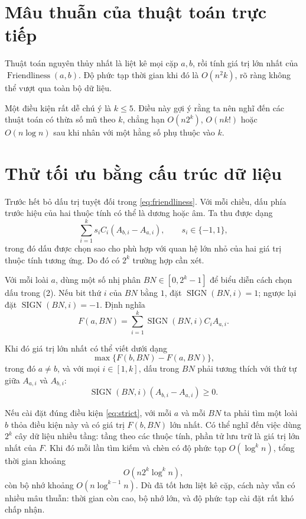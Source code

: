 \documentclass[11pt]{article}
\begin{document}
\section{Mâu thuẫn của thuật toán trực tiếp}

Thuật toán nguyên thủy nhất là liệt kê mọi cặp \(a,b\), rồi tính giá trị lớn
nhất của \(\operatorname{Friendliness}(a,b)\). Độ phức tạp thời gian khi đó là
\(O(n^2k)\), rõ ràng không thể vượt qua toàn bộ dữ liệu.

Một điều kiện rất dễ chú ý là \(k\le 5\). Điều này gợi ý rằng ta nên nghĩ đến
các thuật toán có thừa số mũ theo \(k\), chẳng hạn \(O(n2^k)\), \(O(nk!)\) hoặc
\(O(n\log n)\) sau khi nhân với một hằng số phụ thuộc vào \(k\).

\section{Thử tối ưu bằng cấu trúc dữ liệu}

Trước hết bỏ dấu trị tuyệt đối trong \eqref{eq:friendliness}. Với mỗi chiều, dấu phía trước hiệu
của hai thuộc tính có thể là dương hoặc âm. Ta thu được dạng
\begin{equation}
  \sum_{i=1}^{k} s_i C_i(A_{b,i}-A_{a,i}),
  \qquad s_i\in\{-1,1\},
\label{eq:signed}
\end{equation}
trong đó dấu được chọn sao cho phù hợp với quan hệ lớn nhỏ của hai giá trị
thuộc tính tương ứng. Do đó có \(2^k\) trường hợp cần xét.

Với mỗi loài \(a\), dùng một số nhị phân \(BN\in[0,2^k-1]\) để biểu diễn cách
chọn dấu trong (2). Nếu bit thứ \(i\) của \(BN\) bằng \(1\), đặt
\(\operatorname{SIGN}(BN,i)=1\); ngược lại đặt
\(\operatorname{SIGN}(BN,i)=-1\). Định nghĩa
\[
  F(a,BN)=\sum_{i=1}^{k}\operatorname{SIGN}(BN,i)C_iA_{a,i}.
\]

Khi đó giá trị lớn nhất có thể viết dưới dạng
\begin{equation}
  \max\{F(b,BN)-F(a,BN)\},
\label{eq:maxf}
\end{equation}
trong đó \(a\ne b\), và với mọi \(i\in[1,k]\), dấu trong \(BN\) phải tương
thích với thứ tự giữa \(A_{a,i}\) và \(A_{b,i}\):
\begin{equation}
  \operatorname{SIGN}(BN,i)(A_{b,i}-A_{a,i})\ge 0.
\label{eq:strict}
\end{equation}

Nếu cài đặt đúng điều kiện \eqref{eq:strict}, với mỗi \(a\) và mỗi \(BN\) ta phải tìm một
loài \(b\) thỏa điều kiện này và có giá trị \(F(b,BN)\) lớn nhất. Có thể nghĩ
đến việc dùng \(2^k\) cây dữ liệu nhiều tầng: tầng theo các thuộc tính, phần
tử lưu trữ là giá trị lớn nhất của \(F\). Khi đó mỗi lần tìm kiếm và chèn có
độ phức tạp \(O(\log^k n)\), tổng thời gian khoảng
\[
  O(n2^k\log^k n),
\]
còn bộ nhớ khoảng \(O(n\log^{k-1}n)\). Dù đã tốt hơn liệt kê cặp, cách này vẫn
có nhiều mâu thuẫn: thời gian còn cao, bộ nhớ lớn, và độ phức tạp cài đặt rất
khó chấp nhận.
\end{document}
